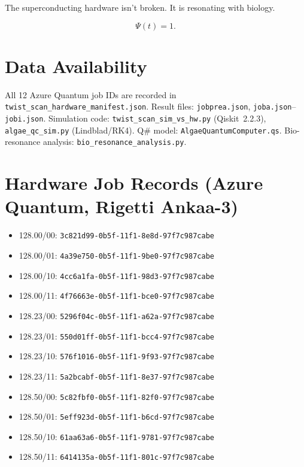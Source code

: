 \documentclass[11pt,twocolumn]{article}
\begin{document}
The superconducting hardware isn't broken.  It is resonating with
biology.

\begin{equation}
  \Psi(t) = 1.
\end{equation}

\section*{Data Availability}

All 12 Azure Quantum job IDs are recorded in
\texttt{twist\_scan\_hardware\_manifest.json}.
Result files: \texttt{jobprea.json}, \texttt{joba.json}--\texttt{jobi.json}.
Simulation code: \texttt{twist\_scan\_sim\_vs\_hw.py} (Qiskit~2.2.3),
\texttt{algae\_qc\_sim.py} (Lindblad/RK4).
Q\# model: \texttt{AlgaeQuantumComputer.qs}.
Bio-resonance analysis: \texttt{bio\_resonance\_analysis.py}.

\section*{Hardware Job Records (Azure Quantum, Rigetti Ankaa-3)}

\small
\begin{itemize}
  \item 128.00\textdegree{}/00: \texttt{3c821d99-0b5f-11f1-8e8d-97f7c987cabe}
  \item 128.00\textdegree{}/01: \texttt{4a39e750-0b5f-11f1-9be0-97f7c987cabe}
  \item 128.00\textdegree{}/10: \texttt{4cc6a1fa-0b5f-11f1-98d3-97f7c987cabe}
  \item 128.00\textdegree{}/11: \texttt{4f76663e-0b5f-11f1-bce0-97f7c987cabe}
  \item 128.23\textdegree{}/00: \texttt{5296f04c-0b5f-11f1-a62a-97f7c987cabe}
  \item 128.23\textdegree{}/01: \texttt{550d01ff-0b5f-11f1-bcc4-97f7c987cabe}
  \item 128.23\textdegree{}/10: \texttt{576f1016-0b5f-11f1-9f93-97f7c987cabe}
  \item 128.23\textdegree{}/11: \texttt{5a2bcabf-0b5f-11f1-8e37-97f7c987cabe}
  \item 128.50\textdegree{}/00: \texttt{5c82fbf0-0b5f-11f1-82f0-97f7c987cabe}
  \item 128.50\textdegree{}/01: \texttt{5eff923d-0b5f-11f1-b6cd-97f7c987cabe}
  \item 128.50\textdegree{}/10: \texttt{61aa63a6-0b5f-11f1-9781-97f7c987cabe}
  \item 128.50\textdegree{}/11: \texttt{6414135a-0b5f-11f1-801c-97f7c987cabe}
\end{itemize}
\end{document}
